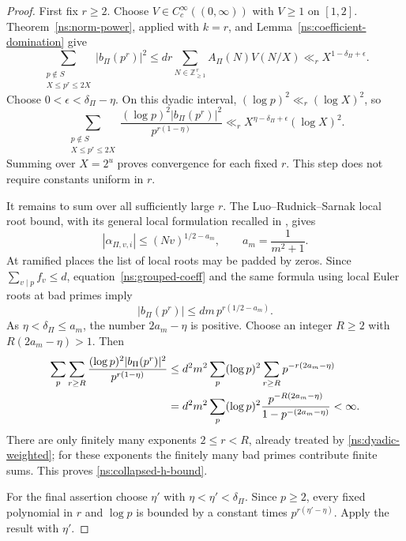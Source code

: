 \documentclass[11pt,reqno]{amsart}
\numberwithin{equation}{section}
\theoremstyle{definition}
\theoremstyle{remark}
\begin{document}
\begin{proof}
First fix $r\ge2$. Choose $V\in C_c^\infty((0,\infty))$ with $V\ge1$ on $[1,2]$. Theorem~\ref{ns:norm-power}, applied with $k=r$, and Lemma~\ref{ns:coefficient-domination} give
\begin{equation}\label{ns:dyadic-fixed-r}
\sum_{\substack{p\notin S\\X\le p^r\le2X}}|b_\Pi(p^r)|^2
\le dr\sum_{N\in\mathbb Z_{\ge1}^{\,r}}A_\Pi(N)V(N/X)
\ll_r X^{1-\delta_\Pi+\epsilon}.
\end{equation}
Choose $0<\epsilon<\delta_\Pi-\eta$. On this dyadic interval, $(\log p)^2\ll_r(\log X)^2$, so
\begin{equation}\label{ns:dyadic-weighted}
\sum_{\substack{p\notin S\\X\le p^r\le2X}}
\frac{(\log p)^2|b_\Pi(p^r)|^2}{p^{r(1-\eta)}}
\ll_r X^{\eta-\delta_\Pi+\epsilon}(\log X)^2.
\end{equation}
Summing over $X=2^u$ proves convergence for each fixed $r$. This step does not require constants uniform in $r$.

It remains to sum over all sufficiently large $r$. The Luo--Rudnick--Sarnak local root bound, with its general local formulation recalled in \cite[\S3.3]{HT}, gives
\begin{equation}\label{ns:root-bound}
|\alpha_{\Pi,v,i}|\le(Nv)^{1/2-a_m},\qquad a_m=\frac1{m^2+1}.
\end{equation}
At ramified places the list of local roots may be padded by zeros. Since $\sum_{v\mid p}f_v\le d$, equation~\eqref{ns:grouped-coeff} and the same formula using local Euler roots at bad primes imply
\begin{equation}\label{ns:pointwise-grouped}
|b_\Pi(p^r)|\le dm\,p^{r(1/2-a_m)}.
\end{equation}
As $\eta<\delta_\Pi\le a_m$, the number $2a_m-\eta$ is positive. Choose an integer $R\ge2$ with $R(2a_m-\eta)>1$. Then
\begin{align}
\sum_p\sum_{r\ge R}
\frac{(\log p)^2|b_\Pi(p^r)|^2}{p^{r(1-\eta)}}
&\le d^2m^2\sum_p(\log p)^2
       \sum_{r\ge R}p^{-r(2a_m-\eta)}\notag\\
&=d^2m^2\sum_p(\log p)^2
\frac{p^{-R(2a_m-\eta)}}{1-p^{-(2a_m-\eta)}}<\infty.
\label{ns:large-r-tail}
\end{align}
There are only finitely many exponents $2\le r<R$, already treated by \eqref{ns:dyadic-weighted}; for these exponents the finitely many bad primes contribute finite sums. This proves \eqref{ns:collapsed-h-bound}.

For the final assertion choose $\eta'$ with $\eta<\eta'<\delta_\Pi$. Since $p\ge2$, every fixed polynomial in $r$ and $\log p$ is bounded by a constant times $p^{r(\eta'-\eta)}$. Apply the result with $\eta'$.
\end{proof}
\end{document}
